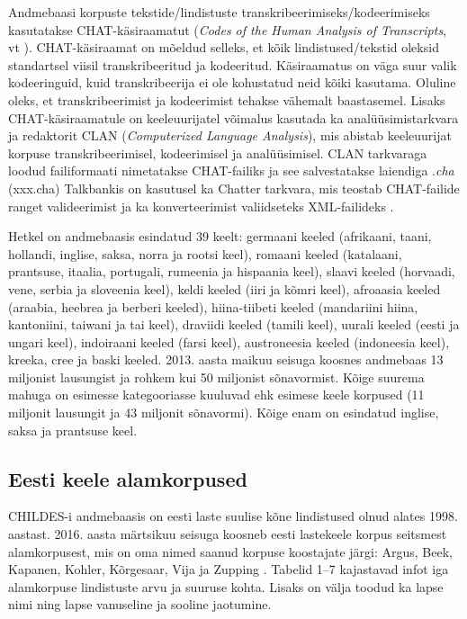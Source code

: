 \documentclass[12pt]{article}
\begin{document}
Andmebaasi korpuste tekstide/lindistuste transkribeerimiseks/kodeerimiseks kasutatakse CHAT-käsiraamatut (\emph{Codes of the Human Analysis of Transcripts}, vt \citep{CHAT}). CHAT-käsiraamat on mõeldud selleks, et kõik lindistused/tekstid oleksid standartsel viisil transkribeeritud ja kodeeritud. Käsiraamatus on väga suur valik kodeeringuid, kuid transkribeerija ei ole kohustatud neid kõiki kasutama. Oluline oleks, et transkribeerimist ja kodeerimist tehakse vähemalt baastasemel. Lisaks CHAT-käsiraamatule on keeleuurijatel võimalus kasutada ka analüüsimistarkvara ja redaktorit CLAN (\emph{Computerized Language Analysis}), mis abistab keeleuurijat korpuse transkribeerimisel, kodeerimisel ja analüüsimisel. CLAN tarkvaraga loodud failiformaati nimetatakse CHAT-failiks ja see salvestatakse laiendiga .\emph{cha} (xxx.cha) \citep[1--2, 6]{Gillis} Talkbankis on kasutusel ka Chatter tarkvara, mis teostab CHAT-failide ranget valideerimist ja ka konverteerimist valiidseteks XML-failideks \citep{CHATTER}.

Hetkel on andmebaasis esindatud 39 keelt: germaani keeled (afrikaani, taani, hollandi, inglise, saksa, norra ja rootsi keel), romaani keeled (katalaani, prantsuse, itaalia, portugali, rumeenia ja hispaania keel), slaavi keeled (horvaadi, vene, serbia ja sloveenia keel), keldi keeled (iiri ja kõmri keel), afroaasia keeled (araabia, heebrea ja berberi keeled), hiina-tiibeti keeled (mandariini hiina, kantoniini, taiwani ja tai keel), draviidi keeled (tamili keel), uurali keeled (eesti ja ungari keel), indoiraani keeled (farsi keel), austroneesia keeled (indoneesia keel), kreeka, cree ja baski keeled. 2013. aasta maikuu seisuga koosnes andmebaas 13 miljonist lausungist ja rohkem kui 50 miljonist sõnavormist. Kõige suurema mahuga on esimesse kategooriasse kuuluvad ehk esimese keele korpused (11 miljonit lausungit ja 43 miljonit sõnavormi). Kõige enam on esindatud inglise, saksa ja prantsuse keel.\citep[2--5]{Gillis}

\subsection{Eesti keele alamkorpused}

CHILDES-i andmebaasis on eesti laste suulise kõne lindistused olnud alates 1998. aastast. 2016. aasta märtsikuu seisuga koosneb eesti lastekeele korpus seitsmest alamkorpusest, mis on oma nimed saanud korpuse koostajate järgi: Argus, Beek, Kapanen, Kohler, Kõrgesaar, Vija ja Zupping \citep{CHILDES}. Tabelid 1--7 kajastavad infot iga alamkorpuse lindistuste arvu ja suuruse kohta. Lisaks on välja toodud ka lapse nimi ning lapse vanuseline ja sooline jaotumine.\\
\hfill
\end{document}
